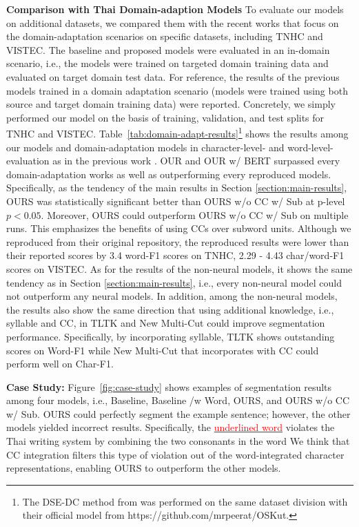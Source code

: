 \noindent\textbf{Comparison with Thai Domain-adaption Models}
To evaluate our models on additional datasets, we compared them with the recent works that focus on the domain-adaptation scenarios on specific datasets, including TNHC and VISTEC. 
The baseline and proposed models were evaluated in an in-domain scenario, i.e., the models were trained on targeted domain training data and evaluated on target domain test data. 
%
For reference, the results of the previous models \cite{limkonchotiwat-etal-2020-domain,limkonchotiwat-etal-2021-handling} trained in a domain adaptation scenario (models were trained using both source and target domain training data) were reported.
%
Concretely, we simply performed our model on the basis of training, validation, and test splits for TNHC and VISTEC.
%
Table~\ref{tab:domain-adapt-results}\footnote{The DSE-DC method from  was performed on the same dataset division with their official model from https://github.com/mrpeerat/OSKut.} shows the results among our models and domain-adaptation models in character-level- and word-level-evaluation as in the previous work \cite{limkonchotiwat-etal-2020-domain,limkonchotiwat-etal-2021-handling}. 
%
OUR and OUR w/ BERT surpassed every domain-adaptation works as well as outperforming every reproduced models.
%
Specifically, as the tendency of the main results in Section \ref{section:main-results}, OURS was statistically significant better than OURS w/o CC w/ Sub at p-level $p < 0.05$.
%
Moreover, OURS could outperform OURS w/o CC w/ Sub on multiple runs.
%
This emphasizes the benefits of using CCs over subword units.
%
Although we reproduced  from their original repository, the reproduced results were lower than their reported scores by 3.4 word-F1 scores on TNHC, 2.29 - 4.43 char/word-F1 scores on VISTEC.
%
As for the results of the non-neural models, it shows the same tendency as in Section \ref{section:main-results}, i.e., every non-neural model could not outperform any neural models.
%
In addition, among the non-neural models, the results also show the same direction that using additional knowledge, i.e., syllable and CC, in TLTK and New Multi-Cut could improve segmentation performance.
%
Specifically, by incorporating syllable, TLTK shows outstanding scores on Word-F1 while New Multi-Cut that incorporates with CC could perform well on Char-F1. 

\medskip\noindent\textbf{Case Study:}\label{section:case-study}
Figure~\ref{fig:case-study} shows examples of segmentation results among four models, i.e., Baseline, Baseline /w Word, OURS, and OURS w/o CC w/ Sub.
%
OURS could perfectly segment the example sentence; however, the other models yielded incorrect results. 
%
Specifically, the \textcolor{red}{\underline{underlined word}} violates the Thai writing system by combining the two consonants in the word
%
We think that CC integration filters this type of violation out of the word-integrated character representations, enabling OURS to outperform the other models.
%
 
